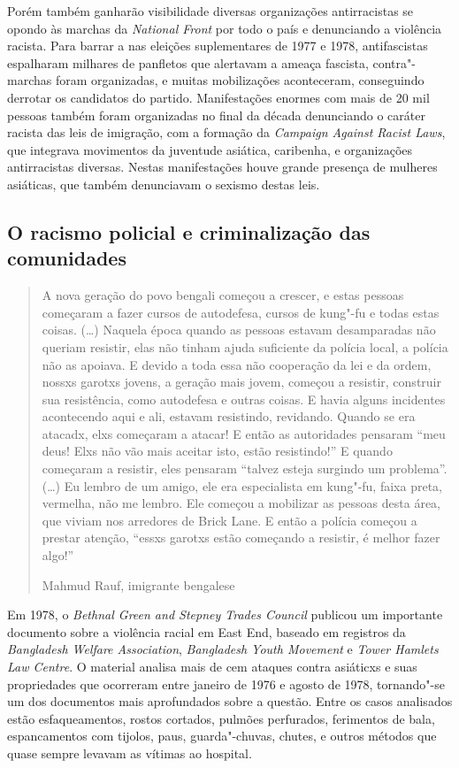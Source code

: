 Porém também ganharão visibilidade diversas organizações antirracistas se opondo às marchas da \emph{National Front} por todo o país e denunciando a violência racista. Para barrar a  nas eleições suplementares de 1977 e 1978, antifascistas espalharam milhares de panfletos que alertavam a ameaça fascista, contra"-marchas foram organizadas, e muitas mobilizações aconteceram, conseguindo derrotar os candidatos do partido. Manifestações enormes com mais de 20 mil pessoas também foram organizadas no final da década denunciando o caráter racista das leis de imigração, com a formação da \emph{Campaign Against Racist Laws}, que integrava movimentos da juventude asiática, caribenha, e organizações antirracistas diversas. Nestas manifestações houve grande presença de mulheres asiáticas, que também denunciavam o sexismo destas leis.

\subsection{O racismo policial e criminalização das comunidades}

\begin{quote}
A nova geração do povo bengali começou a crescer, e estas pessoas começaram a fazer cursos de autodefesa, cursos de kung"-fu e todas estas coisas. (\ldots{}) Naquela época quando as pessoas estavam desamparadas não queriam resistir, elas não tinham ajuda suficiente da polícia local, a polícia não as apoiava. E devido a toda essa não cooperação da lei e da ordem, nossxs garotxs jovens, a geração mais jovem, começou a resistir, construir sua resistência, como autodefesa e outras coisas. E havia alguns incidentes acontecendo aqui e ali, estavam resistindo, revidando. Quando se era atacadx, elxs começaram a atacar! E então as autoridades pensaram ``meu deus! Elxs não vão mais aceitar isto, estão resistindo!'' E quando começaram a resistir, eles pensaram ``talvez esteja surgindo um problema''. (\ldots{}) Eu lembro de um amigo, ele era especialista em kung"-fu, faixa preta, vermelha, não me lembro. Ele começou a mobilizar as pessoas desta área, que viviam nos arredores de Brick Lane. E então a polícia começou a prestar atenção, ``essxs garotxs estão começando a resistir, é melhor fazer algo!''

Mahmud Rauf, imigrante bengalese
\end{quote}

Em 1978, o \emph{Bethnal Green and Stepney Trades Council} publicou um importante documento sobre a violência racial em East End, baseado em registros da \emph{Bangladesh Welfare Association}, \emph{Bangladesh Youth Movement} e \emph{Tower Hamlets Law Centre}. O material analisa mais de cem ataques contra asiáticxs e suas propriedades que ocorreram entre janeiro de 1976 e agosto de 1978, tornando"-se um dos documentos mais aprofundados sobre a questão. Entre os casos analisados estão esfaqueamentos, rostos cortados, pulmões perfurados, ferimentos de bala, espancamentos com tijolos, paus, guarda"-chuvas, chutes, e outros métodos que quase sempre levavam as vítimas ao hospital.

